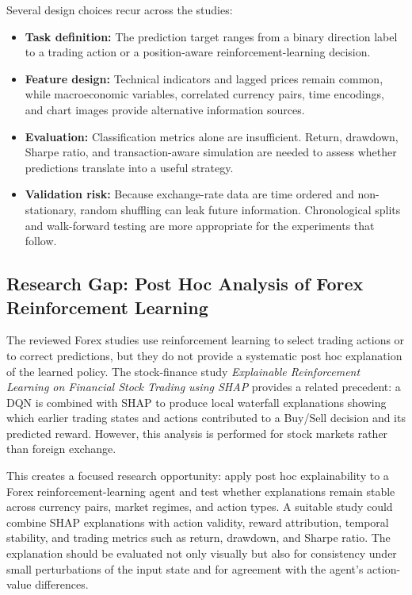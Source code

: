 Several design choices recur across the studies:
\begin{itemize}[leftmargin=1.5cm]
	\item \textbf{Task definition:} The prediction target ranges from a binary direction label to a trading action or a position-aware reinforcement-learning decision.
	\item \textbf{Feature design:} Technical indicators and lagged prices remain common, while macroeconomic variables, correlated currency pairs, time encodings, and chart images provide alternative information sources.
	\item \textbf{Evaluation:} Classification metrics alone are insufficient. Return, drawdown, Sharpe ratio, and transaction-aware simulation are needed to assess whether predictions translate into a useful strategy.
	\item \textbf{Validation risk:} Because exchange-rate data are time ordered and non-stationary, random shuffling can leak future information. Chronological splits and walk-forward testing are more appropriate for the experiments that follow.
\end{itemize}

\subsection{Research Gap: Post Hoc Analysis of Forex Reinforcement Learning}

The reviewed Forex studies use reinforcement learning to select trading actions or to correct predictions, but they do not provide a systematic post hoc explanation of the learned policy. The stock-finance study \textit{Explainable Reinforcement Learning on Financial Stock Trading using SHAP} provides a related precedent: a DQN is combined with SHAP to produce local waterfall explanations showing which earlier trading states and actions contributed to a Buy/Sell decision and its predicted reward. However, this analysis is performed for stock markets rather than foreign exchange.

This creates a focused research opportunity: apply post hoc explainability to a Forex reinforcement-learning agent and test whether explanations remain stable across currency pairs, market regimes, and action types. A suitable study could combine SHAP explanations with action validity, reward attribution, temporal stability, and trading metrics such as return, drawdown, and Sharpe ratio. The explanation should be evaluated not only visually but also for consistency under small perturbations of the input state and for agreement with the agent's action-value differences.

